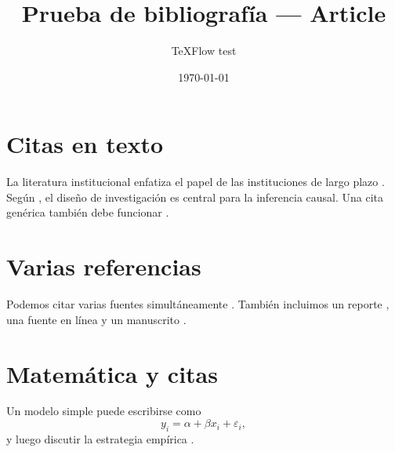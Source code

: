 \documentclass[11pt,a4paper]{article}
\title{Prueba de bibliografía — Article}
\author{TeXFlow test}
\date{\today}
\begin{document}
\maketitle

\section{Citas en texto}
La literatura institucional enfatiza el papel de las instituciones de largo plazo \parencite{acemoglu2001}.
Según \textcite{angrist2009}, el diseño de investigación es central para la inferencia causal.
Una cita genérica también debe funcionar \cite{heckman1979}.

\section{Varias referencias}
Podemos citar varias fuentes simultáneamente \parencite{acemoglu2001,angrist2009}.
También incluimos un reporte \parencite{worldbank2024}, una fuente en línea \parencite{ourworld2025} y un manuscrito \parencite{workingpaper2026}.

\section{Matemática y citas}
Un modelo simple puede escribirse como
\[
y_i = \alpha + \beta x_i + \varepsilon_i,
\]
y luego discutir la estrategia empírica \parencite{angrist2009}.

\printbibliography
\end{document}
